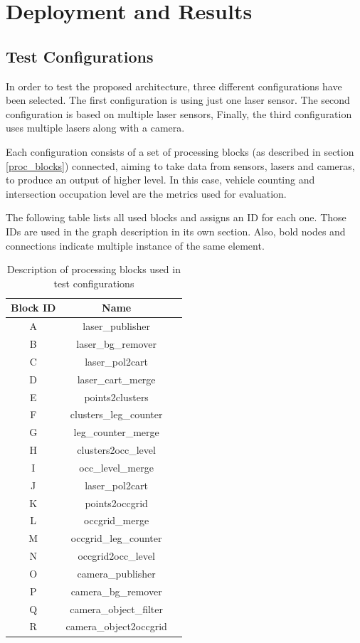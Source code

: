 \chapter [Deployment and Results]{Deployment and Results}

\section{Test Configurations}
In order to test the proposed architecture, three different configurations have been selected. The first configuration is using just one laser sensor. The second configuration is based on multiple laser sensors, Finally, the third configuration uses multiple lasers along with a camera.

Each configuration consists of a set of processing blocks (as described in section \ref{proc_blocks}) connected, aiming to take data from sensors, lasers and cameras, to produce an output of higher level. In this case, vehicle counting and intersection occupation level are the metrics used for evaluation.

The following table lists all used blocks and assigns an ID for each one. Those IDs are used in the graph description in its own section. Also, bold nodes and connections indicate multiple instance of the same element.

\begin{table}[ht!]
\footnotesize
\centering
\begin{tabular}{|c | c| c|}
\hline
\textbf{Block ID} & \textbf{Name} \\
\hline
A & laser\_publisher \\
\hline
B & laser\_bg\_remover \\
\hline
C & laser\_pol2cart \\
\hline
D & laser\_cart\_merge \\
\hline
E & points2clusters \\
\hline
F & clusters\_leg\_counter \\
\hline
G & leg\_counter\_merge \\
\hline
H & clusters2occ\_level \\
\hline
I & occ\_level\_merge \\
\hline
J & laser\_pol2cart \\
\hline
K & points2occgrid \\
\hline
L & occgrid\_merge \\
\hline
M & occgrid\_leg\_counter \\
\hline
N & occgrid2occ\_level \\
\hline
O & camera\_publisher \\
\hline
P & camera\_bg\_remover \\
\hline
Q & camera\_object\_filter \\
\hline
R & camera\_object2occgrid \\
\hline
\end{tabular}
\caption{Description of processing blocks used in test configurations}
\label{desc_test_config}
\end{table}


